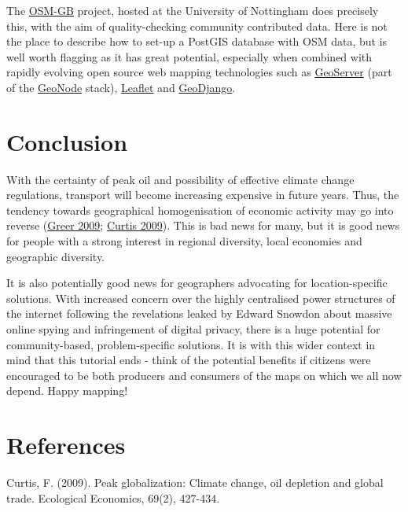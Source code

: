 \documentclass[]{article}
\begin{document}
The \href{http://wiki.openstreetmap.org/wiki/Osm2pgsql}{OSM-GB} project,
hosted at the University of Nottingham does precisely this, with the aim
of quality-checking community contributed data. Here is not the place to
describe how to set-up a PostGIS database with OSM data, but is well
worth flagging as it has great potential, especially when combined with
rapidly evolving open source web mapping technologies such as
\href{http://geoserver.org/display/GEOS/Welcome}{GeoServer} (part of the
\href{http://geonode.org/}{GeoNode} stack),
\href{http://leafletjs.com/}{Leaflet} and
\href{https://www.djangoproject.com/}{GeoDjango}.

\section{Conclusion}\label{conclusion}

With the certainty of peak oil and possibility of effective climate
change regulations, transport will become increasing expensive in future
years. Thus, the tendency towards geographical homogenisation of
economic activity may go into reverse
(\href{http://books.google.co.uk/books?hl=en\&lr=\&id=mkV_knlze0QC\&oi=fnd\&pg=PP2\&dq=ecotechnic+future\&ots=nATRuCVL31\&sig=bwafIZ7kfmZMK1EscQcKyIGeYsU\&redir_esc=y\#v=onepage\&q=ecotechnic\%20future\&f=false}{Greer
2009};
\href{http://www.sciencedirect.com/science/article/pii/S0921800909003334}{Curtis
2009}). This is bad news for many, but it is good news for people with a
strong interest in regional diversity, local economies and geographic
diversity.

It is also potentially good news for geographers advocating for
location-specific solutions. With increased concern over the highly
centralised power structures of the internet following the revelations
leaked by Edward Snowdon about massive online spying and infringement of
digital privacy, there is a huge potential for community-based,
problem-specific solutions. It is with this wider context in mind that
this tutorial ends - think of the potential benefits if citizens were
encouraged to be both producers and consumers of the maps on which we
all now depend. Happy mapping!

\section{References}\label{references}

Curtis, F. (2009). Peak globalization: Climate change, oil depletion and
global trade. Ecological Economics, 69(2), 427-434.
\end{document}
